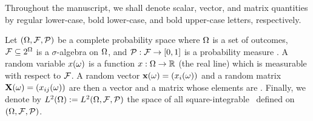 Throughout the manuscript, we shall denote scalar, vector, and matrix quantities by regular lower-case, bold lower-case, and bold upper-case letters, respectively.

Let $(\Omega, \mathcal{F}, \mathcal{P})$ be a complete probability space where $\Omega$ is a set of outcomes, $\mathcal{F} \subseteq 2^\Omega$ is a $\sigma$-algebra on $\Omega$, and $\mathcal{P}: \mathcal{F} \to [0, 1]$ is a probability measure \cite{maitre2010}.
A random variable $x(\omega)$ is a function $x: \Omega \to \mathbb{R}$ (the real line) which is measurable with respect to $\mathcal{F}$.
A random vector $\mathbf{x}(\omega) = (x_i(\omega))$ and a random matrix $\mathbf{X}(\omega) = (x_{ij}(\omega))$ are then a vector and a matrix whose elements are \rvs.
Finally, we denote by $L^{2}(\Omega) := L^{2}(\Omega, \mathcal{F}, \mathcal{P})$ the space of all square-integrable \rvs\ defined on $(\Omega, \mathcal{F}, \mathcal{P})$.
